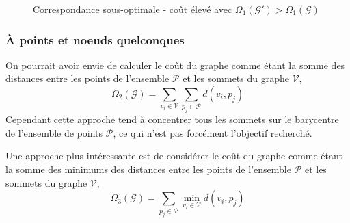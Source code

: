\documentclass[12pt,a4paper]{article}
\begin{document}
\begin{figure}[H]
\centering
{}
\caption{Correspondance sous-optimale - coût élevé avec $\Omega_1(\mathcal{G}') > \Omega_1(\mathcal{G})$}
\end{figure}



\subsubsection{À points et noeuds quelconques}

On pourrait avoir envie de calculer le coût du graphe comme étant la somme des distances entre les points de l'ensemble $\mathcal{P}$ et les sommets du graphe $\mathcal{V}$,
\begin{equation*}
    \Omega_2(\mathcal{G}) = \sum_{v_i \in \mathcal{V}} \sum_{p_j \in \mathcal{P}} d(v_i, p_j)
\end{equation*}
Cependant cette approche tend à concentrer tous les sommets sur le barycentre de l'ensemble de points $\mathcal{P}$,
ce qui n'est pas forcément l'objectif recherché.

Une approche plus intéressante est de considérer le coût du graphe comme étant
la somme des minimums des distances entre les points de l'ensemble $\mathcal{P}$ et les sommets du graphe $\mathcal{V}$,
\begin{equation*}
    \Omega_3(\mathcal{G}) = \sum_{p_j \in \mathcal{P}} \min_{v_i \in \mathcal{V}} d(v_i, p_j)
\end{equation*}
\end{document}
